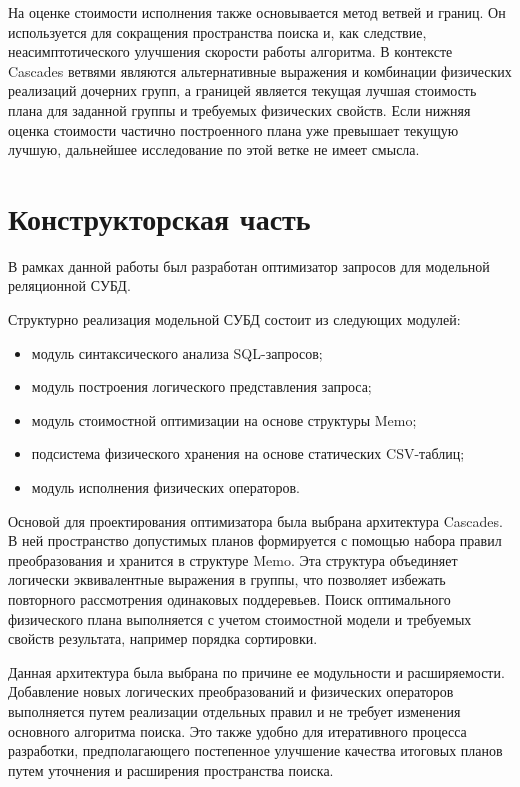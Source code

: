 \documentclass[14pt, russian]{scrartcl}
\begin{document}
На оценке стоимости исполнения также основывается метод ветвей и границ. Он
используется для сокращения пространства поиска и, как следствие,
неасимптотического улучшения скорости работы алгоритма. В контексте Cascades
ветвями являются альтернативные выражения и комбинации физических реализаций
дочерних групп, а границей является текущая лучшая стоимость плана для заданной
группы и требуемых физических свойств. Если нижняя оценка стоимости частично
построенного плана уже превышает текущую лучшую, дальнейшее исследование по этой
ветке не имеет смысла.


\section{Конструкторская часть}

В рамках данной работы был разработан оптимизатор запросов для модельной
реляционной СУБД.

Структурно реализация модельной СУБД состоит из следующих модулей:
\begin{itemize}
  \item модуль синтаксического анализа SQL-запросов;
  \item модуль построения логического представления запроса;
  \item модуль стоимостной оптимизации на основе структуры Memo;
  \item подсистема физического хранения на основе статических CSV-таблиц;
  \item модуль исполнения физических операторов.
\end{itemize}

Основой для проектирования оптимизатора была выбрана архитектура Cascades. В ней
пространство допустимых планов формируется с помощью набора правил
преобразования и хранится в структуре Memo. Эта структура объединяет логически
эквивалентные выражения в группы, что позволяет избежать повторного рассмотрения
одинаковых поддеревьев. Поиск оптимального физического плана выполняется с учетом
стоимостной модели и требуемых свойств результата, например порядка сортировки.

Данная архитектура была выбрана по причине ее модульности и расширяемости.
Добавление новых логических преобразований и физических операторов выполняется
путем реализации отдельных правил и не требует изменения основного алгоритма
поиска. Это также удобно для итеративного процесса разработки, предполагающего
постепенное улучшение качества итоговых планов путем уточнения и расширения
пространства поиска.
\end{document}
